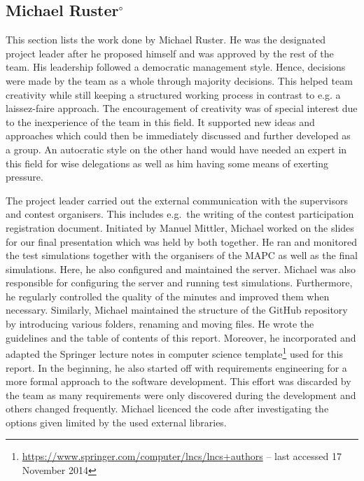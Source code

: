 \subsection[Michael Ruster]{Michael Ruster$^{\circ}$}\label{org:0nse}
This section lists the work done by Michael Ruster.
He was the designated project leader after he proposed himself and was approved by the rest of the team.
His leadership followed a democratic management style.
Hence, decisions were made by the team as a whole through majority decisions.
This helped team creativity while still keeping a structured working process in contrast to e.g. a laissez-faire approach.
The encouragement of creativity was of special interest due to the inexperience of the team in this field.
It supported new ideas and approaches which could then be immediately discussed and further developed as a group.
An autocratic style on the other hand would have needed an expert in this field for wise delegations as well as him having some means of exerting pressure.

The project leader carried out the external communication with the supervisors and contest organisers.
This includes e.g.\ the writing of the contest participation registration document.
Initiated by Manuel Mittler, Michael worked on the slides for our final presentation which was held by both together.
He ran and monitored the test simulations together with the organisers of the MAPC as well as the final simulations.
Here, he also configured and maintained the server.
Michael was also responsible for configuring the server and running test simulations.
Furthermore, he regularly controlled the quality of the minutes and improved them when necessary.
Similarly, Michael maintained the structure of the GitHub repository by introducing various folders, renaming and moving files.
He wrote the guidelines and the table of contents of this report.
Moreover, he incorporated and adapted the Springer lecture notes in computer science template\footnote{\url{https://www.springer.com/computer/lncs/lncs+authors} -- last accessed 17 November 2014} used for this report.
In the beginning, he also started off with requirements engineering for a more formal approach to the software development.
This effort was discarded by the team as many requirements were only discovered during the development and others changed frequently.
Michael licenced the code after investigating the options given limited by the used external libraries.

